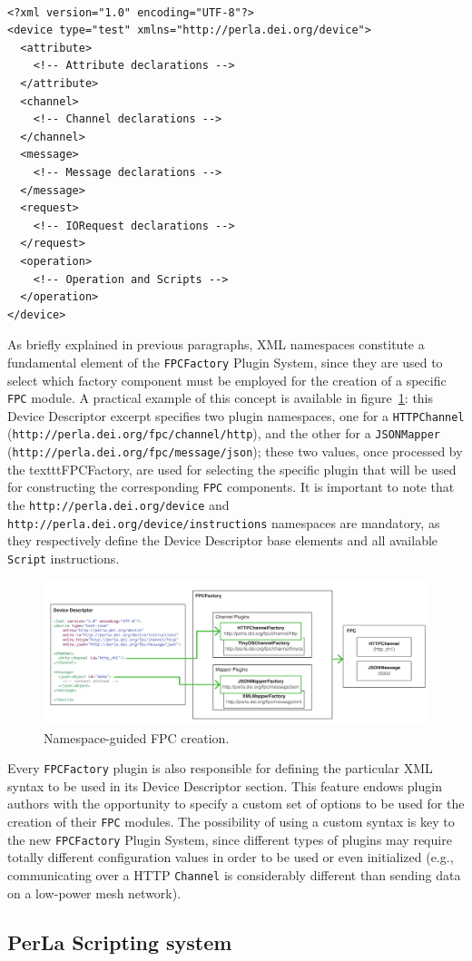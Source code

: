~\\
\lstset{language=XML}
\begin{lstlisting}[caption={The skeleton of the new XML Device Descriptor.}]
<?xml version="1.0" encoding="UTF-8"?>
<device type="test" xmlns="http://perla.dei.org/device">
  <attribute>
    <!-- Attribute declarations -->
  </attribute>
  <channel>
    <!-- Channel declarations -->
  </channel>
  <message>
    <!-- Message declarations -->
  </message>
  <request>
    <!-- IORequest declarations -->
  </request>
  <operation>
    <!-- Operation and Scripts -->
  </operation>
</device>
\end{lstlisting}

As briefly explained in previous paragraphs, XML namespaces constitute a
fundamental element of the \texttt{FPCFactory} Plugin System, since they are
used to select which factory component must be employed for the creation of a
specific \texttt{FPC} module. A practical example of this concept is available
in figure~\ref{fig:dd_namespace}: this Device Descriptor excerpt specifies two
plugin namespaces, one for a \texttt{HTTPChannel}
(\texttt{http://perla.dei.org/fpc/channel/http}), and the other for a
\texttt{JSONMapper} (\texttt{http://perla.dei.org/fpc/message/json}); these two
values, once processed by the texttt{FPCFactory}, are used for selecting the
specific plugin that will be used for constructing the corresponding
\texttt{FPC} components. It is important to note that the
\texttt{http://perla.dei.org/device} and
\texttt{http://perla.dei.org/device/instructions} namespaces are mandatory, as
they respectively define the Device Descriptor base elements and all available
\texttt{Script} instructions.

\begin{figure}[h!]
\center
\includegraphics[width=\textwidth]{imgs/dd_namespace.pdf}
\caption{Namespace-guided FPC creation.}
\label{fig:dd_namespace}
\end{figure}

Every \texttt{FPCFactory} plugin is also responsible for defining the
particular XML syntax to be used in its Device Descriptor section. This feature
endows plugin authors with the opportunity to specify a custom set of options
to be used for the creation of their \texttt{FPC} modules. The possibility of
using a custom syntax is key to the new \texttt{FPCFactory} Plugin System,
since different types of plugins may require totally different configuration
values in order to be used or even initialized (e.g., communicating over a HTTP
\texttt{Channel} is considerably different than sending data on a low-power
mesh network).

\subsection{PerLa Scripting system}



